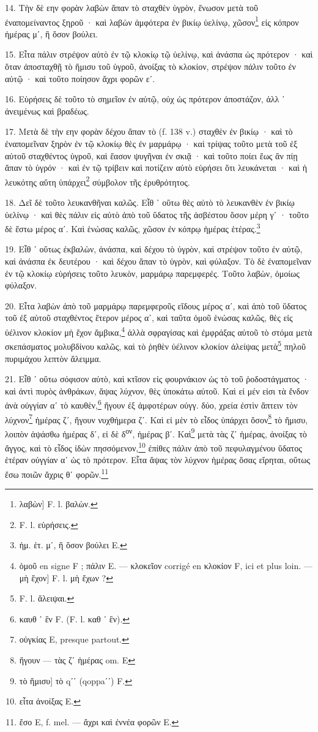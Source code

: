 \documentclass[a4paper, 11pt, oneside, polutonikogreek, french]{article}
\begin{document}
14. Τὴν δὲ εην φορὰν λαβὼν ἅπαν τὸ σταχθὲν ὑγρὸν, ἕνωσον μετὰ τοῦ ἐναπομείναντος ξηροῦ · καὶ λαβὼν ἀμφότερα ἐν βικίῳ ὑελίνῳ, χῶσον\footnote{λαβὼν] F. l. βαλὼν.} εἰς κόπρον ἡμέρας μʹ, ἢ ὅσον βούλει.

15. Εἶτα πάλιν στρέψον αὐτὸ ἐν τῷ κλοκίῳ τῷ ὑελίνῳ, καὶ ἀνάσπα ὡς πρότερον · καὶ ὅταν ἀποσταχθῇ τὸ ἥμισυ τοῦ ὑγροῦ, ἀνοίξας τὸ κλοκίον, στρέψον πάλιν τοῦτο ἐν αὐτῷ · καὶ τοῦτο ποίησον ἄχρι φορῶν εʹ.

16. Εὑρήσεις δὲ τοῦτο τὸ σημεῖον ἐν αὐτῷ, οὐχ ὡς πρότερον ἀποστάζον, ἀλλ ᾽ ἀνειμένως καὶ βραδέως.

17. Μετὰ δὲ τὴν εην φορὰν δέχου ἅπαν τὸ (f. 138 v.) σταχθὲν ἐν βικίῳ · καὶ τὸ ἐναπομεῖναν ξηρὸν ἐν τῷ κλοκίῳ θὲς ἐν μαρμάρῳ · καὶ τρίψας τοῦτο μετὰ τοῦ ἐξ αὐτοῦ σταχθέντος ὑγροῦ, καὶ ἔασον ψυγῆναι ἐν σκιᾷ · καὶ τοῦτο ποίει ἕως ἂν πίῃ ἅπαν τὸ ὑγρόν · καὶ ἐν τῷ τρίβειν καὶ ποτίζειν αὐτὸ εὑρήσει ὅτι λευκάνεται · καὶ ἡ λευκότης αὕτη ὑπάρχει\footnote{F. l. εὑρήσεις.} σύμβολον τῆς ἐρυθρότητος.

18. Δεῖ δὲ τοῦτο λευκανθῆναι καλῶς. Εἶθ ᾽ οὕτω θὲς αὐτὸ τὸ λευκανθὲν ἐν βικίῳ ὑελίνῳ · καὶ θὲς πάλιν εἰς αὐτὸ ἀπὸ τοῦ ὕδατος τῆς ἀσβέστου ὅσον μέρη γʹ · τοῦτο δὲ ἔστω μέρος αʹ. Καὶ ἑνώσας καλῶς, χῶσον ἐν κόπρῳ ἡμέρας ἑτέρας.\footnote{ἡμ. ἑτ. μʹ, ἢ ὅσον βούλει E.}

19. Εἶθ ᾽ οὕτως ἐκβαλὼν, ἀνάσπα, καὶ δέχου τὸ ὑγρὸν, καὶ στρέψον τοῦτο ἐν αὐτῷ, καὶ ἀνάσπα ἐκ δευτέρου · καὶ δέχου ἅπαν τὸ ὑγρὸν, καὶ φύλαξον. Τὸ δὲ ἐναπομεῖναν ἐν τῷ κλοκίῳ εὑρήσεις τοῦτο λευκὸν, μαρμάρῳ παρεμφερές. Τοῦτο λαβὼν, ὁμοίως φύλαξον.

20. Εἶτα λαβὼν ἀπὸ τοῦ μαρμάρῳ παρεμφεροῦς εἴδους μέρος αʹ, καὶ ἀπὸ τοῦ ὕδατος τοῦ ἐξ αὐτοῦ σταχθέντος ἕτερον μέρος αʹ, καὶ ταῦτα ὁμοῦ ἑνώσας καλῶς, θὲς εἰς ὑέλινον κλοκίον μὴ ἔχον ἄμβικα,\footnote{ὁμοῦ en signe F ; πάλιν E. --- κλοκεῖον corrigé en κλοκίον F, ici et plus loin. --- μὴ ἔχον] F. l. μὴ ἔχων ?} ἀλλὰ σφραγίσας καὶ ἐμφράξας αὐτοῦ τὸ στόμα μετὰ σκεπάσματος μολυβδίνου καλῶς, καὶ τὸ ῥηθὲν ὑέλινον κλοκίον ἀλείψας μετὰ\footnote{F. l. ἄλειψαι.} πηλοῦ πυριμάχου λεπτὸν ἄλειμμα.

21. Εἶθ ᾽ οὕτω σόφισον αὐτὸ, καὶ κτῖσον εἰς φουρνάκιον ὡς τὸ τοῦ ῥοδοστάγματος · καὶ ἀντὶ πυρὸς ἀνθράκων, ἅψας λύχνον, θὲς ὑποκάτω αὐτοῦ. Καὶ εἰ μέν εἰσι τὰ ἔνδον ἀνὰ οὐγγίαν αʹ τὸ καυθὲν,\footnote{καυθ ᾽ ἓν F. (F. l. καθ ᾽ ἓν).} ἤγουν ἐξ ἀμφοτέρων οὐγγ. δύο, χρεία ἐστὶν ἅπτειν τὸν λύχνον\footnote{οὐγκίας E, presque partout.} ἡμέρας ζʹ, ἤγουν νυχθήμερα ζʹ. Καὶ εἰ μὲν τὸ εἶδος ὑπάρχει ὅσον\footnote{ἤγουν --- τὰς ζʹ ἡμέρας om. E} τὸ ἥμισυ, λοιπὸν ἁψάσθω ἡμέρας δʹ, εἰ δὲ δ\textsuperscript{ον}, ἡμέρας βʹ. Καὶ\footnote{τὸ ἥμισυ] τὸ qʹʹ (qoppaʹʹ) F.} μετὰ τὰς ζʹ ἡμέρας, ἀνοίξας τὸ ἄγγος, καὶ τὸ εἶδος ἰδὼν πησσόμενον,\footnote{εἶτα ἀνοίξας E.} ἐπίθες πάλιν ἀπὸ τοῦ πεφυλαγμένου ὕδατος ἑτέραν οὐγγίαν αʹ ὡς τὸ πρότερον. Εἶτα ἅψας τὸν λύχνον ἡμέρας ὅσας εἴρηται, οὕτως ἔσω ποιῶν ἄχρις θʹ φορῶν.\footnote{ἔσο E, f. mel. --- ἄχρι καὶ ἐννέα φορῶν E.}
\end{document}
